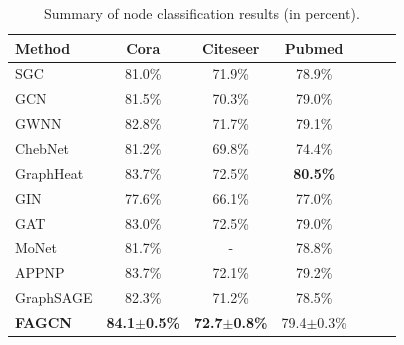 \documentclass[letterpaper]{article} %
\begin{document}
\newsavebox{\tablebox}
\begin{table}
  \centering
  \caption{Summary of node classification results (in percent).}
	\begin{lrbox}{\tablebox}
    \begin{tabular}{lcccccc}
    \toprule
    \textbf{Method} & \textbf{Cora} & \textbf{Citeseer} & \textbf{Pubmed} \\
    \midrule
	SGC & 81.0\% & 71.9\% & 78.9\% \\
    GCN & 81.5\% & 70.3\% & 79.0\% \\
    GWNN & 82.8\% & 71.7\% & 79.1\%\\
    ChebNet & 81.2\% & 69.8\% & 74.4\%\\
    GraphHeat & 83.7\% & 72.5\% & \textbf{80.5\%}\\
	\midrule
	GIN & 77.6\% & 66.1\% & 77.0\%\\ 
	GAT & 83.0\% & 72.5\% & 79.0\%\\
	MoNet & 81.7\% & -     & 78.8\%\\
	APPNP & 83.7\% & 72.1\% & 79.2\%\\
    GraphSAGE & 82.3\% & 71.2\% & 78.5\%\\
    \midrule
	\textbf{FAGCN} & \textbf{84.1$\pm$0.5\%} & \textbf{72.7$\pm$0.8\%} & 79.4$\pm$0.3\% \\
    \bottomrule
    \end{tabular}
    \end{lrbox}
    \scalebox{1}{\usebox{\tablebox}}
  \label{assortative}
\end{table}
\end{document}
